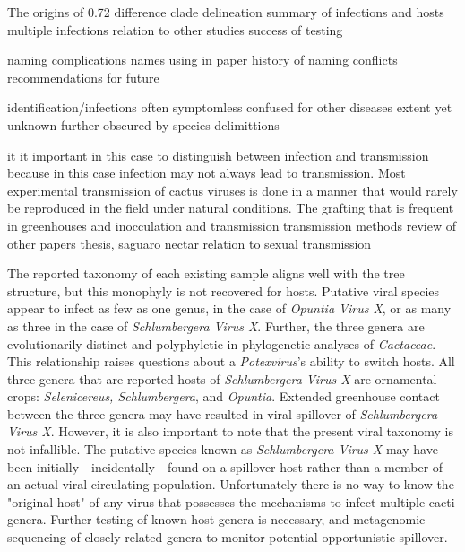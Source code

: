 \documentclass[fleqn,10pt,lineno]{wlpeerj}
\begin{document}
The 
origins of 0.72 difference
clade delineation
summary of infections and hosts
multiple infections
relation to other studies
success of testing


naming complications
names using in paper
history of naming conflicts
recommendations for future

identification/infections
often symptomless confused for other diseases
extent yet unknown
further obscured by species delimittions

it it important in this case to distinguish between infection and transmission because in this case infection may not always lead to transmission. 
Most experimental transmission of cactus viruses is done in a manner that would rarely be reproduced in the field under natural conditions.
The grafting that is frequent in greenhouses and 
inocculation and transmission
transmission methods
review of other papers
thesis, saguaro nectar
relation to sexual transmission


 
The reported taxonomy of each existing sample aligns well with the tree structure, but this monophyly is not recovered for hosts.
Putative viral species appear to infect as few as one genus, in the case of \textit{Opuntia Virus X}, or as many as three in the case of \textit{Schlumbergera Virus X}.
Further, the three genera are evolutionarily distinct and polyphyletic in phylogenetic analyses of \textit{Cactaceae}. 
This relationship raises questions about a \textit{Potexvirus}'s ability to switch hosts. %
All three genera that are reported hosts of \textit{Schlumbergera Virus X} are ornamental crops: \textit{Selenicereus, Schlumbergera}, and \textit{Opuntia}.
Extended greenhouse contact between the three genera may have resulted in viral spillover of \textit{Schlumbergera Virus X}.
However, it is also important to note that the present viral taxonomy is not infallible. 
The putative species known as \textit{Schlumbergera Virus X} may have been initially - incidentally - found on a spillover host rather than a member of an actual viral circulating population.
Unfortunately there is no way to know the "original host" of any virus that possesses the mechanisms to infect multiple cacti genera. 
Further testing of known host genera is necessary, and metagenomic sequencing of closely related genera to monitor potential opportunistic spillover. 
\end{document}
